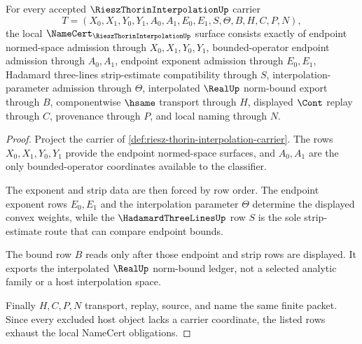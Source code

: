 \begin{theorem}
\label{thm:riesz-thorin-interpolation-namecert-obligations}
For every accepted $\RieszThorinInterpolationUp$ carrier
$$
T=(X_0,X_1,Y_0,Y_1,A_0,A_1,E_0,E_1,S,\Theta,B,H,C,P,N),
$$
the local $\NameCert_{\RieszThorinInterpolationUp}$ surface consists exactly of endpoint normed-space admission through $X_0,X_1,Y_0,Y_1$, bounded-operator endpoint admission through $A_0,A_1$, endpoint exponent admission through $E_0,E_1$, Hadamard three-lines strip-estimate compatibility through $S$, interpolation-parameter admission through $\Theta$, interpolated $\RealUp$ norm-bound export through $B$, componentwise $\hsame$ transport through $H$, displayed $\Cont$ replay through $C$, provenance through $P$, and local naming through $N$.
\end{theorem}
\begin{proof}
Project the carrier of \autoref{def:riesz-thorin-interpolation-carrier}. The rows $X_0,X_1,Y_0,Y_1$ provide the endpoint normed-space surfaces, and $A_0,A_1$ are the only bounded-operator coordinates available to the classifier.

The exponent and strip data are then forced by row order. The endpoint exponent rows $E_0,E_1$ and the interpolation parameter $\Theta$ determine the displayed convex weights, while the $\HadamardThreeLinesUp$ row $S$ is the sole strip-estimate route that can compare endpoint bounds.

The bound row $B$ reads only after those endpoint and strip rows are displayed. It exports the interpolated $\RealUp$ norm-bound ledger, not a selected analytic family or a host interpolation space.

Finally $H,C,P,N$ transport, replay, source, and name the same finite packet. Since every excluded host object lacks a carrier coordinate, the listed rows exhaust the local NameCert obligations.
\end{proof}

